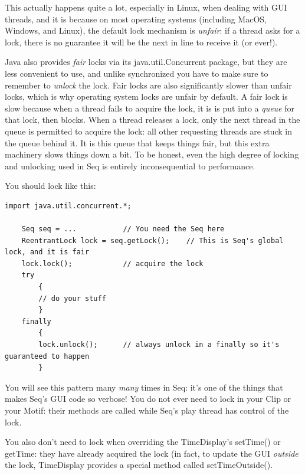 \documentclass[twoside,10pt]{article}
\begin{document}
This actually happens quite a lot, especially in Linux, when dealing with GUI threads, and it is because on most operating systems (including MacOS, Windows, and Linux), the default lock mechanism is {\it unfair}: if a thread asks for a lock, there is no guarantee it will be the next in line to receive it (or ever!).

Java also provides {\it fair} locks via its {\sf java.util.Concurrent} package, but they are less convenient to use, and unlike {\sf synchronized} you have to make sure to remember to {\it unlock} the lock.  Fair locks are also significantly slower than unfair locks, which is why operating system locks are unfair by default.  A fair lock is slow because when a thread fails to acquire the lock, it is is put into a {\it queue} for that lock, then blocks.  When a thread releases a lock, only the next thread in the queue is permitted to acquire the lock: all other requesting threads are stuck in the queue behind it.  It is this queue that keeps things fair, but this extra machinery slows things down a bit.  To be honest, even the high degree of locking and unlocking used in Seq is entirely inconsequential to performance. 

You should lock like this:

\begin{verbatim}
import java.util.concurrent.*;

    Seq seq = ...           // You need the Seq here
    ReentrantLock lock = seq.getLock();    // This is Seq's global lock, and it is fair
    lock.lock();            // acquire the lock
    try
        {
        // do your stuff
        }
    finally
        {
        lock.unlock();      // always unlock in a finally so it's guaranteed to happen
        }
\end{verbatim}

You will see this pattern many {\it many} times in Seq: it's one of the things that makes Seq's GUI code so verbose!  You do not ever need to lock in your Clip or your Motif: their methods are called while Seq's play thread has control of the lock.  

You also don't need to lock when overriding the TimeDisplay's {\sf setTime()} or {\sf getTime}: they have already acquired the lock (in fact, to update the GUI {\it outside} the lock, TimeDisplay provides a special method called {\sf setTimeOutside()}.  
\end{document}
